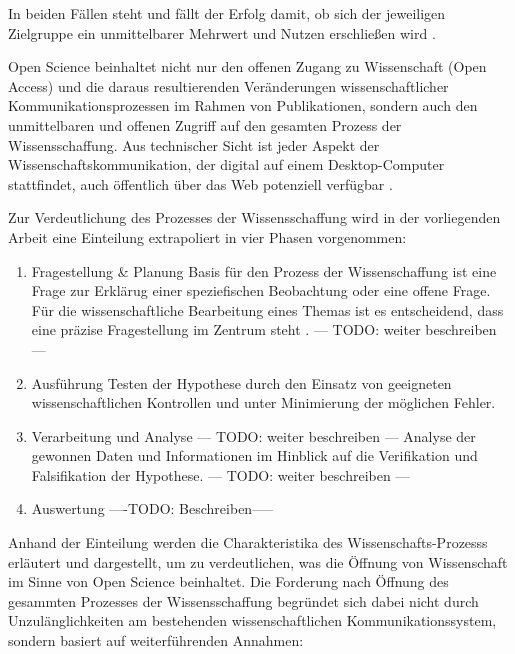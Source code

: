 In beiden Fällen steht und fällt der Erfolg damit, ob sich der jeweiligen Zielgruppe ein unmittelbarer Mehrwert und Nutzen erschließen wird \cite{schulze_2013_open}.

Open Science beinhaltet nicht nur den offenen Zugang zu Wissenschaft (Open Access) und die daraus resultierenden Veränderungen wissenschaftlicher Kommunikationsprozessen im Rahmen von Publikationen, sondern auch den unmittelbaren und offenen Zugriff auf den gesamten Prozess der Wissensschaffung. Aus technischer Sicht ist jeder Aspekt der Wissenschaftskommunikation, der digital auf einem Desktop-Computer stattfindet, auch öffentlich über das Web potenziell verfügbar \cite{mietchen2012wissenschaft}.

Zur Verdeutlichung des Prozesses der Wissensschaffung wird in der vorliegenden Arbeit eine Einteilung extrapoliert in vier Phasen vorgenommen:
\begin{enumerate}
\item Fragestellung & Planung
Basis für den Prozess der Wissenschaffung ist eine Frage zur Erklärug einer speziefischen Beobachtung oder eine offene Frage\cite{suchen}. Für die wissenschaftliche Bearbeitung eines Themas ist es entscheidend, dass eine präzise Fragestellung im Zentrum steht \cite{suchen}. --- TODO: weiter beschreiben ---
\item Ausführung
Testen der Hypothese durch den Einsatz von geeigneten wissenschaftlichen Kontrollen und unter Minimierung der möglichen Fehler.
\item Verarbeitung und Analyse --- TODO: weiter beschreiben ---
Analyse der gewonnen Daten und Informationen im Hinblick auf die Verifikation und Falsifikation der Hypothese. --- TODO: weiter beschreiben ---
\item Auswertung
----TODO: Beschreiben-----
\end{enumerate}

Anhand der Einteilung werden die Charakteristika des Wissenschafts-Prozesss erläutert und dargestellt, um zu verdeutlichen, was die Öffnung von Wissenschaft im Sinne von Open Science beinhaltet. Die Forderung nach Öffnung des gesammten Prozesses der Wissensschaffung begründet sich dabei nicht durch Unzulänglichkeiten am bestehenden wissenschaftlichen Kommunikationssystem, sondern basiert auf weiterführenden Annahmen:

